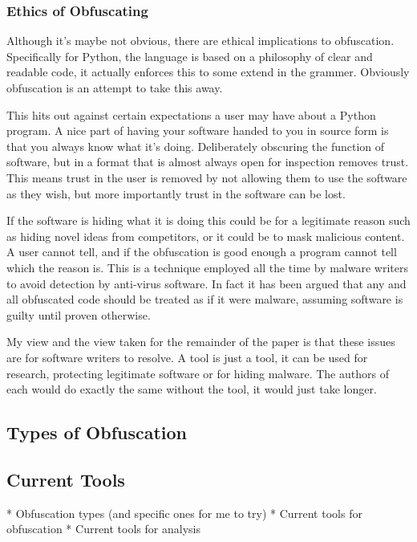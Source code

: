 \documentclass{report}
\begin{document}
\subsubsection{Ethics of Obfuscating}

Although it's maybe not obvious, there are ethical implications to obfuscation. Specifically for Python, the
language is based on a philosophy of clear and readable code, it actually enforces this to some extend in the
grammer. Obviously obfuscation is an attempt to take this away.

This hits out against certain expectations a user may have about a Python program. A nice part of having your
software handed to you in source form is that you always know what it's doing. Deliberately obscuring the
function of software, but in a format that is almost always open for inspection removes trust. This means
trust in the user is removed by not allowing them to use the software as they wish, but more importantly
trust in the software can be lost.

If the software is hiding what it is doing this could be for a legitimate reason such as hiding novel ideas
from competitors, or it could be to mask malicious content. A user cannot tell, and if the obfuscation is
good enough a program cannot tell which the reason is. This is a technique employed all the time by malware
writers to avoid detection by anti-virus software\cite{dycodeobf}. In fact it has been argued that any and
all obfuscated code should be treated as if it were malware\cite{noobf}, assuming software is guilty until
proven otherwise.

My view and the view taken for the remainder of the paper is that these issues are for software writers to
resolve. A tool is just a tool, it can be used for research, protecting legitimate software or for hiding
malware. The authors of each would do exactly the same without the tool, it would just take longer.

\subsection{Types of Obfuscation}

\subsection{Current Tools}



* Obfuscation types (and specific ones for me to try)
* Current tools for obfuscation
* Current tools for analysis
\end{document}

